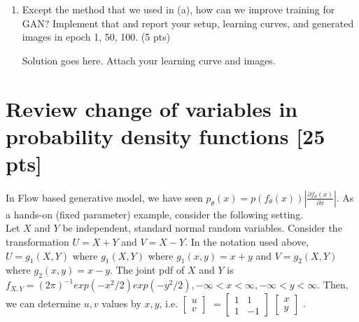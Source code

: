 \documentclass[a4paper]{article}
\theoremstyle{definition}
\newenvironment{soln}{
	\leavevmode\color{blue}\ignorespaces
}{}
\begin{document}
\begin{enumerate} [label=(\alph*)]
		\item Except the method that we used in (a), how can we improve training for GAN? Implement that and report your setup, learning curves, and generated images in epoch 1, 50, 100.
		\hfill (5 pts)
		
		\begin{soln}  Solution goes here. Attach your learning curve and images. \end{soln}
		
	\end{enumerate}

	\section{Review change of variables in probability density functions [25 pts]} In Flow based generative model, we have seen $p_{\theta}(x)=p(f_{\theta}(x))|\frac{\partial f_{\theta}(x)}{\partial x}|$. As a hands-on (fixed parameter) example, consider the following setting.\\
	Let $X$ and $Y$ be independent, standard normal random variables. Consider the transformation $U=X+Y$ and $V=X-Y$. In the notation used above, $U=g_{1}(X, Y)$ where $g_{1}(X, Y)$ where $g_{1}(x, y)=x+y$ and $V=g_{2}(X, Y)$ where $g_{2}(x,y)=x-y$. The joint pdf of $X$ and $Y$ is $f_{X, Y}=(2\pi)^{-1} exp(-x^{2}/2) exp(-y^{2}/2), -\infty < x < \infty, -\infty < y < \infty$. Then, we can determine $u, v$ values by $x, y$, i.e. 
	$
	\begin{bmatrix}
		u\\
		v
	\end{bmatrix}
	$
	$=\begin{bmatrix}
		1 & 1 \\ 
		1 & -1
	\end{bmatrix}
	$
	$
	\begin{bmatrix}
		x\\
		y
	\end{bmatrix}
	$
	.
	
\end{document}
